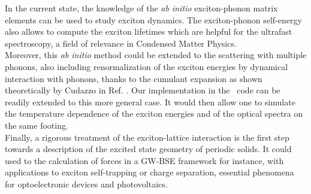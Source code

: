 In the current state, the knowledge of the \textit{ab initio} exciton-phonon matrix elements can be used to study exciton dynamics.\cite{cohen2023phonon} The exciton-phonon self-energy also allows to compute the exciton lifetimes which are helpful for the ultrafast spectroscopy, a field of relevance in Condensed Matter Physics.\\

Moreover, this \textit{ab initio} method could be extended to the scattering with multiple phonons, also including renormalization of the exciton energies by dynamical interaction with phonons, thanks to the cumulant expansion as shown theoretically by Cudazzo in Ref. \cite{cudazzo2020first}. Our implementation in the \yambo~code can be readily extended to this more general case. It would then allow one to simulate the temperature dependence of the exciton energies and of the optical spectra on the same footing.\\


Finally, a rigorous treatment of the exciton-lattice interaction is the first step towards a description of the excited state geometry of periodic solids. It could used to the calculation of forces in a GW-BSE framework for instance, with applications to exciton self-trapping or charge separation, essential phenomena for optoelectronic devices and photovoltaics.

